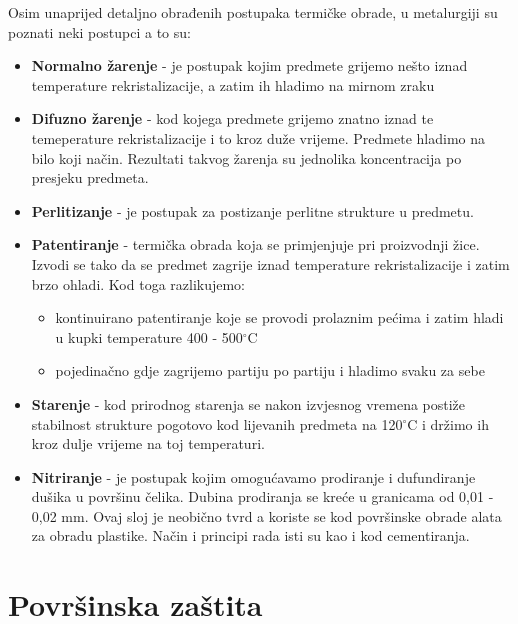 \documentclass[a4paper,12pt]{article}
\numberwithin{figure}{section}
\begin{document}
Osim unaprijed detaljno obrađenih postupaka termičke obrade, u metalurgiji su poznati neki postupci a to su:
\begin{itemize}
\item \textbf{Normalno žarenje} - je postupak kojim predmete grijemo nešto iznad temperature rekristalizacije, a zatim ih hladimo na mirnom zraku
\item \textbf{Difuzno žarenje} - kod kojega predmete grijemo znatno iznad te temeperature rekristalizacije i to kroz duže vrijeme. Predmete hladimo na bilo koji način. Rezultati takvog žarenja su jednolika koncentracija po presjeku predmeta.
\item \textbf{Perlitizanje} - je postupak za postizanje perlitne strukture u predmetu.
\item \textbf{Patentiranje} - termička obrada koja se primjenjuje pri proizvodnji žice. Izvodi se tako da se predmet zagrije iznad temperature rekristalizacije i zatim brzo ohladi. Kod toga razlikujemo:
\begin{itemize}
\item kontinuirano patentiranje koje se provodi prolaznim pećima i zatim hladi u kupki temperature 400 - 500$^{\circ}$C
\item pojedinačno gdje zagrijemo partiju po partiju i hladimo svaku za sebe
\end{itemize}
\item \textbf{Starenje} - kod prirodnog starenja se nakon izvjesnog vremena postiže stabilnost strukture pogotovo kod lijevanih predmeta na 120$^{\circ}$C i držimo ih kroz dulje vrijeme na toj temperaturi.
\item \textbf{Nitriranje} - je postupak kojim omogućavamo prodiranje i dufundiranje dušika u površinu čelika. Dubina prodiranja se kreće u granicama od 0,01 - 0,02 mm. Ovaj sloj je neobično tvrd a koriste se kod površinske obrade alata za obradu plastike. Način i principi rada isti su kao i kod cementiranja.
\end{itemize}
\section{Površinska zaštita}
\end{document}
